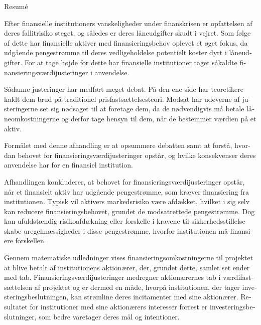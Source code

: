 \documentclass[main.tex]{subfiles}
\begin{document}
    \begin{otherlanguage}{danish}
    \thispagestyle{empty}
    \begin{center}
    {\LARGE Resumé}
    \end{center}

    Efter finansielle institutioners vanskeligheder under finanskrisen 
    er opfattelsen af deres fallitrisiko steget, og således er deres låneudgifter skudt i vejret.
    Som følge af dette har finansielle aktiver med finansieringsbehov oplevet et øget fokus, 
    da udgående pengestrømme til deres vedligeholdelse potentielt koster dyrt i låneudgifter.
    For at tage højde for dette
    har finansielle institutioner taget såkaldte finansieringsværdijusteringer i anvendelse.

    Sådanne justeringer har medført meget debat. 
    På den ene side har teoretikere kaldt dem brud på traditionel prisfastsættelsesteori.
    Modsat har udøverne af justeringerne set sig nødsaget til at foretage dem,
    da de nødvendigvis må betale låneomkostningerne 
    og derfor tage hensyn til dem, når de bestemmer værdien på et aktiv. 

    Formålet med denne afhandling er at opsummere debatten
    samt at forstå, hvordan behovet for finansieringsværdijusteringer opstår, 
    og hvilke konsekvenser deres anvendelse har for en finansiel institution. 

    Afhandlingen konkluderer, at behovet for finansieringsværdijusteringer opstår, 
    når et finansielt aktiv har udgående pengestrømme, som kræver finansiering fra institutionen.
    Typisk vil aktivers markedsrisiko være afdækket,
    hvilket i sig selv kan reducere finansieringsbehovet, grundet de modsatrettede pengestrømme.
    Dog kan ufuldstændig risikoafdækning eller forskelle i kravene til sikkerhedsstillelse
    skabe uregelmæssigheder i disse pengestrømme, hvorfor institutionen må finansiere forskellen.
    
    Gennem matematiske udledninger vises finansieringsomkostningerne til projektet
    at blive betalt af institutionens aktionærer,
    der, grundet dette, samlet set ender med tab.
    Finansieringsværdijusteringer medregner aktionærernes tab i værdifastsættelsen af projektet
    og er dermed en måde, hvorpå institutionen, der tager investeringsbeslutningen, 
    kan strømline deres incitamenter med sine aktionærer. 
    Resultatet for institutioner med sine aktionærers interesser forrest
    er investeringsbeslutninger, som bedre varetager deres mål og intentioner.
    
    \end{otherlanguage}
\end{document}
